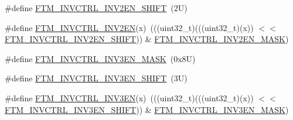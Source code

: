 \begin{DoxyCompactItemize}
\#define \mbox{\hyperlink{group___f_t_m___register___masks_gaf304b51f57fe6a028674e4de62558868}{F\+T\+M\+\_\+\+I\+N\+V\+C\+T\+R\+L\+\_\+\+I\+N\+V2\+E\+N\+\_\+\+S\+H\+I\+FT}}~(2\+U)
\item 
\#define \mbox{\hyperlink{group___f_t_m___register___masks_gaab5508d48988ad41a34596564a8d883c}{F\+T\+M\+\_\+\+I\+N\+V\+C\+T\+R\+L\+\_\+\+I\+N\+V2\+EN}}(x)~(((uint32\+\_\+t)(((uint32\+\_\+t)(x)) $<$$<$ \mbox{\hyperlink{group___f_t_m___register___masks_gaf304b51f57fe6a028674e4de62558868}{F\+T\+M\+\_\+\+I\+N\+V\+C\+T\+R\+L\+\_\+\+I\+N\+V2\+E\+N\+\_\+\+S\+H\+I\+FT}})) \& \mbox{\hyperlink{group___f_t_m___register___masks_ga529f3c3f58ca2c039fee08830dfe3a8a}{F\+T\+M\+\_\+\+I\+N\+V\+C\+T\+R\+L\+\_\+\+I\+N\+V2\+E\+N\+\_\+\+M\+A\+SK}})
\item 
\#define \mbox{\hyperlink{group___f_t_m___register___masks_ga1f9f536afb4e0b9b5041f35b51dc0008}{F\+T\+M\+\_\+\+I\+N\+V\+C\+T\+R\+L\+\_\+\+I\+N\+V3\+E\+N\+\_\+\+M\+A\+SK}}~(0x8\+U)
\item 
\#define \mbox{\hyperlink{group___f_t_m___register___masks_gaeaa778d3ec63bd86c6a5e840eebfcbe7}{F\+T\+M\+\_\+\+I\+N\+V\+C\+T\+R\+L\+\_\+\+I\+N\+V3\+E\+N\+\_\+\+S\+H\+I\+FT}}~(3\+U)
\item 
\#define \mbox{\hyperlink{group___f_t_m___register___masks_ga4ff1169ec15053ed292d505477ed5641}{F\+T\+M\+\_\+\+I\+N\+V\+C\+T\+R\+L\+\_\+\+I\+N\+V3\+EN}}(x)~(((uint32\+\_\+t)(((uint32\+\_\+t)(x)) $<$$<$ \mbox{\hyperlink{group___f_t_m___register___masks_gaeaa778d3ec63bd86c6a5e840eebfcbe7}{F\+T\+M\+\_\+\+I\+N\+V\+C\+T\+R\+L\+\_\+\+I\+N\+V3\+E\+N\+\_\+\+S\+H\+I\+FT}})) \& \mbox{\hyperlink{group___f_t_m___register___masks_ga1f9f536afb4e0b9b5041f35b51dc0008}{F\+T\+M\+\_\+\+I\+N\+V\+C\+T\+R\+L\+\_\+\+I\+N\+V3\+E\+N\+\_\+\+M\+A\+SK}})
\end{DoxyCompactItemize}
